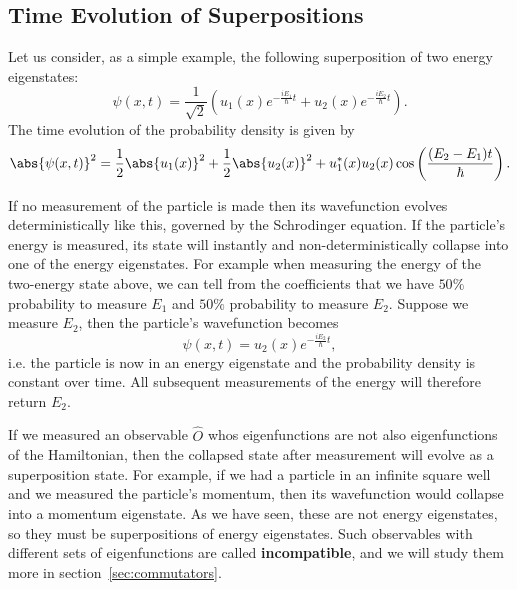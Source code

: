\documentclass[../quantum_mechanics.tex]{subfiles}
\begin{document}
        \subsection{Time Evolution of Superpositions}\label{sec:properties-of-energy-eigenstates:subsec:time-evolution-of-superpositions}
            Let us consider, as a simple example, the following superposition of two energy eigenstates:
            \begin{equation}
                \psi(x,t)=\frac{1}{\sqrt{2}}(u_1(x)e^{-\frac{iE_1}{\hbar}t}+u_2(x)e^{-\frac{iE_2}{\hbar}t}).
            \end{equation}
            The time evolution of the probability density is given by
            \begin{equation}
                \abs{\psi(x,t)}^2=\frac{1}{2}\abs{u_1(x)}^2+\frac{1}{2}\abs{u_2(x)}^2+u_1^\ast(x)u_2(x)\cos\left(\frac{(E_2-E_1)t}{\hbar}\right).
            \end{equation}


            If no measurement of the particle is made then its wavefunction evolves deterministically like this, governed by the Schrodinger equation.
            If the particle's energy is measured, its state will instantly and non-deterministically collapse into one of the energy eigenstates.
            For example when measuring the energy of the two-energy state above, we can tell from the coefficients that we have $50\%$ probability to measure $E_1$ and $50\%$ probability to measure $E_2$.
            Suppose we measure $E_2$, then the particle's wavefunction becomes
            \begin{equation}
                \psi(x,t)=u_2(x)e^{-\frac{iE_2}{\hbar}t},
            \end{equation}
            i.e. the particle is now in an energy eigenstate and the probability density is constant over time.
            All subsequent measurements of the energy will therefore return $E_2$.

            If we measured an observable $\hat{O}$ whos eigenfunctions are not also eigenfunctions of the Hamiltonian, then the collapsed state after measurement will evolve as a superposition state.
            For example, if we had a particle in an infinite square well and we measured the particle's momentum, then its wavefunction would collapse into a momentum eigenstate.
            As we have seen, these are not energy eigenstates, so they must be superpositions of energy eigenstates.
            Such observables with different sets of eigenfunctions are called \textbf{incompatible}, and we will study them more in section~\ref{sec:commutators}.
\end{document}
